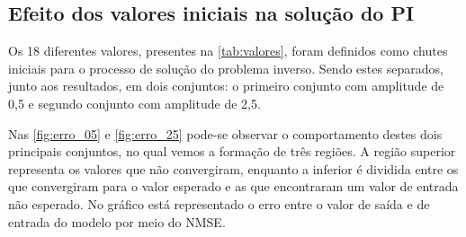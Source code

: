 
\subsection{Efeito dos valores iniciais na solução do PI} \label{subsec:estudoi-pi-efeito}
Os 18 diferentes valores, presentes na \autoref{tab:valores}, foram definidos como chutes iniciais para o processo de solução do problema inverso. Sendo estes separados, junto aos resultados, em dois conjuntos: o primeiro conjunto com amplitude de 0,5 e segundo conjunto com amplitude de 2,5.

Nas \autoref{fig:erro_05} e \autoref{fig:erro_25} pode-se observar o comportamento destes dois principais conjuntos, no qual vemos a formação de três regiões. A região superior representa os valores que não convergiram, enquanto a inferior é dividida entre os que convergiram para o valor esperado e as que encontraram um valor de entrada não esperado. No gráfico está representado o erro entre o valor de saída e de entrada do modelo por meio do NMSE.

